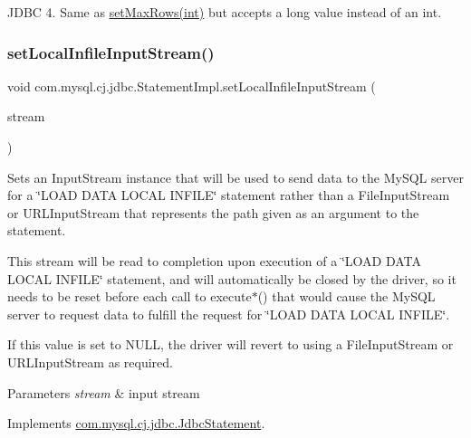 J\+D\+BC 4. Same as \mbox{\hyperlink{classcom_1_1mysql_1_1cj_1_1jdbc_1_1_statement_impl_ab0226070ba29ae3c0cf7431d7b902c01}{set\+Max\+Rows(int)}} but accepts a long value instead of an int. \mbox{\label{classcom_1_1mysql_1_1cj_1_1jdbc_1_1_statement_impl_a398ed93fc7171fac680cd867a87cbf23}} 
\subsubsection{\texorpdfstring{set\+Local\+Infile\+Input\+Stream()}{setLocalInfileInputStream()}}
{\footnotesize\ttfamily void com.\+mysql.\+cj.\+jdbc.\+Statement\+Impl.\+set\+Local\+Infile\+Input\+Stream (\begin{DoxyParamCaption}\item[{Input\+Stream}]{stream }\end{DoxyParamCaption})}

Sets an Input\+Stream instance that will be used to send data to the My\+S\+QL server for a \char`\"{}\+L\+O\+A\+D D\+A\+T\+A L\+O\+C\+A\+L I\+N\+F\+I\+L\+E\char`\"{} statement rather than a File\+Input\+Stream or U\+R\+L\+Input\+Stream that represents the path given as an argument to the statement.

This stream will be read to completion upon execution of a \char`\"{}\+L\+O\+A\+D D\+A\+T\+A L\+O\+C\+A\+L I\+N\+F\+I\+L\+E\char`\"{} statement, and will automatically be closed by the driver, so it needs to be reset before each call to execute$\ast$() that would cause the My\+S\+QL server to request data to fulfill the request for \char`\"{}\+L\+O\+A\+D D\+A\+T\+A L\+O\+C\+A\+L I\+N\+F\+I\+L\+E\char`\"{}.

If this value is set to N\+U\+LL, the driver will revert to using a File\+Input\+Stream or U\+R\+L\+Input\+Stream as required.


\begin{DoxyParams}{Parameters}
{\em stream} & input stream \\
\hline
\end{DoxyParams}


Implements \mbox{\hyperlink{interfacecom_1_1mysql_1_1cj_1_1jdbc_1_1_jdbc_statement_a89093285d02aa790bb07c7afab7c4140}{com.\+mysql.\+cj.\+jdbc.\+Jdbc\+Statement}}.

